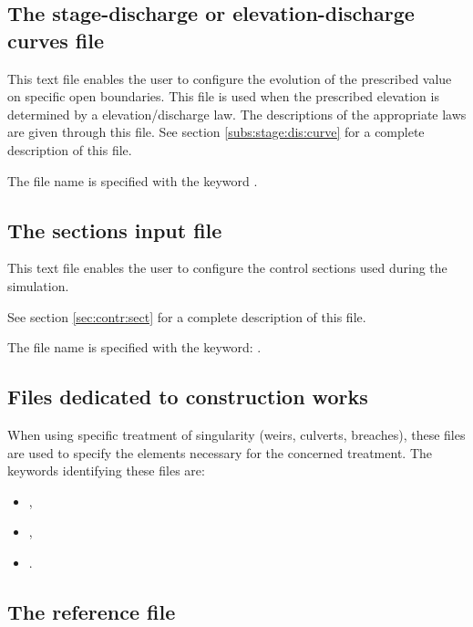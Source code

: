\subsection{The stage-discharge or elevation-discharge curves file}

This text file enables the user to configure the evolution of the prescribed
value on specific open boundaries.
This file is used when the prescribed elevation is determined
by a elevation/discharge law.
The descriptions of the appropriate laws are given through this file.
See section \ref{subs:stage:dis:curve} for a complete description of this file.

The file name is specified with the keyword .


\subsection{The sections input file}

This text file enables the user to configure the control sections used
during the simulation.

See section \ref{sec:contr:sect} for a complete description of this file.

The file name is specified with the keyword: .


\subsection{Files dedicated to construction works}

When using specific treatment of singularity (weirs, culverts, breaches), these
files are used to specify the elements necessary for the concerned treatment.
The keywords identifying these files are:

\begin{itemize}
\item {},


\item {},

\item {}.
\end{itemize}


\subsection{The reference file}

